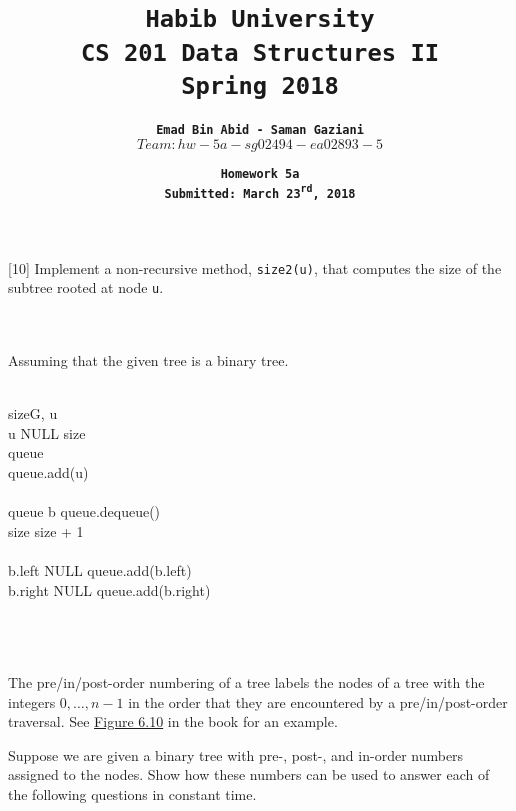 \documentclass[addpoints]{exam}
\title{\textbf{\tt Habib University}\\ \textbf{\tt CS 201 Data Structures II}\\ \textbf{\tt Spring 2018}}
\author{\textbf{\tt Emad Bin Abid - Saman Gaziani}\\ {\tt $Team: hw-5a-sg02494-ea02893-5$}}
\date{\textbf{\tt Homework 5a}\\ \textbf{\tt Submitted: March 23\textsuperscript{rd}, 2018}}
\begin{document}
\maketitle

\begin{questions}

  [10]
  Implement a non-recursive method, {\tt size2(u)}, that computes
  the size of the subtree rooted at node {\tt u}.
  \begin{solution}\\ \\
  	Assuming that the given tree is a binary tree. \\ \\
  	\begin{pseudocode}{size}{G, u}
  		\label{Size}
  		\\
  		
  		\IF u \neq NULL
		\THEN
		\BEGIN
		size  \\
		queue \GETS [$ $]\\
		queue.add(u)\\ \\
		
			\WHILE queue \neq [$ $] \DO 
  			\BEGIN
  				b \GETS queue.dequeue()\\
  				size \GETS size + 1\\ \\
  				
  				\IF b.left \neq NULL
  				\THEN 
  					queue.add(b.left)\\
  				
  				\IF b.right \neq NULL
  				\THEN 
  					queue.add(b.right)\\ 
	  		\END \\ \\
		\END \\
  		\ENDPROCEDURE
  	\end{pseudocode}
  \end{solution}
\pagebreak

  The pre/in/post-order numbering of a tree labels the nodes of a tree with the integers $0,\ldots,n-1$ in the order that they are encountered by a pre/in/post-order traversal. See \href{http://opendatastructures.org/ods-python/6_3_Discussion_Exercises.html#fig:binarytree-numbering}{Figure 6.10} in the book for an example.

  Suppose we are given a binary tree with pre-, post-, and in-order numbers assigned to the nodes. Show how these numbers can be used to answer each of the following questions in constant time.
  \begin{parts}

\end{parts}
\end{questions}
\end{document}

